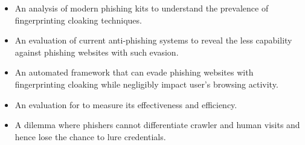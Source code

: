\begin{itemize}
    \item An analysis of modern phishing kits to understand the prevalence of fingerprinting cloaking techniques.
    \item An evaluation of current anti-phishing systems to reveal the less capability against phishing websites with such evasion.
    \item An automated framework that can evade phishing websites with fingerprinting cloaking while negligibly impact user's browsing activity.
    \item An evaluation for \spartacus to measure its effectiveness and efficiency.
    \item A dilemma where phishers cannot differentiate crawler and human visits and hence lose the chance to lure credentials.
\end{itemize}
